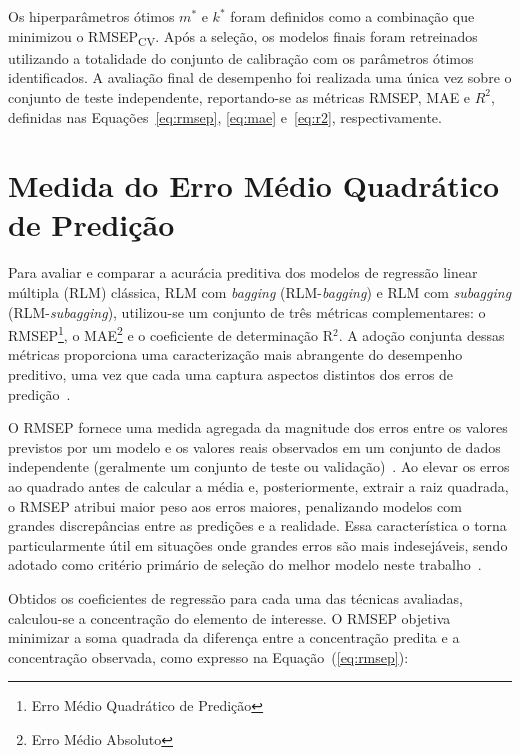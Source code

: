 Os hiperparâmetros ótimos $m^*$ e $k^*$ foram definidos como a 
combinação que minimizou o RMSEP\textsubscript{CV}. Após a seleção, 
os modelos finais foram retreinados utilizando a totalidade do 
conjunto de calibração com os parâmetros ótimos identificados. 
A avaliação final de desempenho foi realizada uma única vez sobre 
o conjunto de teste independente, reportando-se as métricas RMSEP, 
MAE e $R^2$, definidas nas Equações~\ref{eq:rmsep}, \ref{eq:mae} 
e~\ref{eq:r2}, respectivamente.


\section{Medida do Erro Médio Quadrático de Predição}
\label{sec:mederropre}


Para avaliar e comparar a acurácia preditiva dos modelos de regressão 
linear múltipla (RLM) clássica, RLM com \textit{bagging} 
(RLM-\textit{bagging}) e RLM com \textit{subagging} 
(RLM-\textit{subagging}), utilizou-se um conjunto de três métricas 
complementares: o \gls{RMSEP}\footnote{Erro Médio Quadrático de 
Predição}, o \gls{MAE}\footnote{Erro Médio Absoluto} e o coeficiente 
de determinação R$^2$. A adoção conjunta dessas métricas proporciona 
uma caracterização mais abrangente do desempenho preditivo, uma vez 
que cada uma captura aspectos distintos dos erros de 
predição~\cite{Westad2024,kumari2024}.

O \gls{RMSEP} fornece uma medida agregada da magnitude dos erros 
entre os valores previstos por um modelo e os valores reais 
observados em um conjunto de dados independente (geralmente um 
conjunto de teste ou validação)~\cite{Westad2024,kumari2024}. Ao 
elevar os erros ao quadrado antes de calcular a média e, 
posteriormente, extrair a raiz quadrada, o \gls{RMSEP} atribui 
maior peso aos erros maiores, penalizando modelos com grandes 
discrepâncias entre as predições e a realidade. Essa característica 
o torna particularmente útil em situações onde grandes erros são 
mais indesejáveis, sendo adotado como critério primário de seleção 
do melhor modelo neste 
trabalho~\cite{liu2025,perisdiaz2021,jensen2024,Westad2024}.

Obtidos os coeficientes de regressão para cada uma das técnicas 
avaliadas, calculou-se a concentração do elemento de interesse. 
O \gls{RMSEP} objetiva minimizar a soma quadrada da diferença entre a concentração predita e a concentração observada, como expresso na Equação~(\ref{eq:rmsep}):

